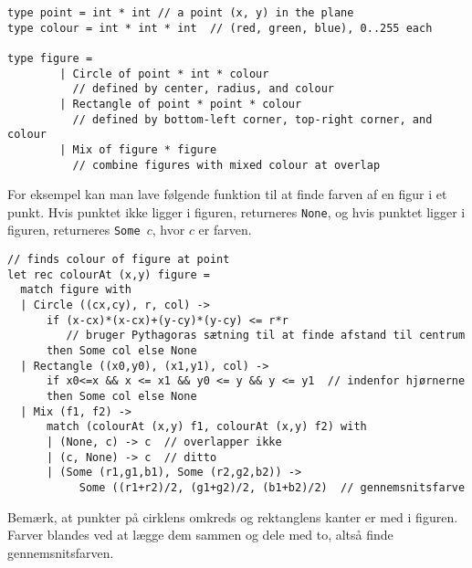 \documentclass[a4paper]{article}
\begin{document}
\begin{verbatim}
type point = int * int // a point (x, y) in the plane
type colour = int * int * int  // (red, green, blue), 0..255 each

type figure =
        | Circle of point * int * colour
          // defined by center, radius, and colour
        | Rectangle of point * point * colour
          // defined by bottom-left corner, top-right corner, and colour
        | Mix of figure * figure
          // combine figures with mixed colour at overlap
\end{verbatim}

\noindent
For eksempel kan man lave følgende funktion til at finde farven af en
figur i et punkt.  Hvis punktet ikke ligger i figuren, returneres
\texttt{None}, og hvis punktet ligger i figuren, returneres
\texttt{Some $c$}, hvor $c$ er farven.

\begin{verbatim}
// finds colour of figure at point
let rec colourAt (x,y) figure =
  match figure with
  | Circle ((cx,cy), r, col) ->
      if (x-cx)*(x-cx)+(y-cy)*(y-cy) <= r*r
         // bruger Pythagoras sætning til at finde afstand til centrum
      then Some col else None
  | Rectangle ((x0,y0), (x1,y1), col) ->
      if x0<=x && x <= x1 && y0 <= y && y <= y1  // indenfor hjørnerne
      then Some col else None
  | Mix (f1, f2) ->
      match (colourAt (x,y) f1, colourAt (x,y) f2) with
      | (None, c) -> c  // overlapper ikke
      | (c, None) -> c  // ditto
      | (Some (r1,g1,b1), Some (r2,g2,b2)) ->
           Some ((r1+r2)/2, (g1+g2)/2, (b1+b2)/2)  // gennemsnitsfarve
\end{verbatim}

\noindent
Bemærk, at punkter på cirklens omkreds og rektanglens kanter er med i
figuren.  Farver blandes ved at lægge dem sammen og dele med to, altså
finde gennemsnitsfarven.
\end{document}
